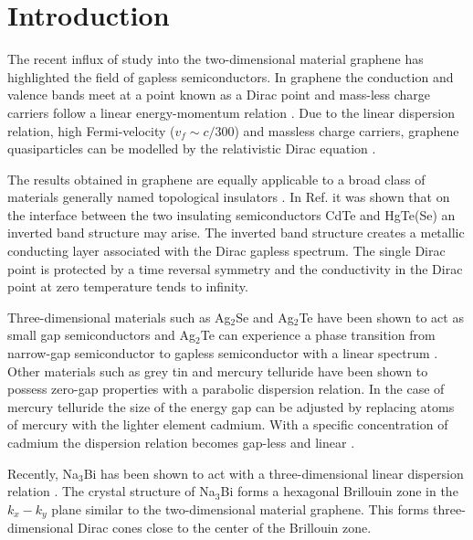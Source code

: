 \documentclass[prb,twocolumn,aps,superscriptaddress,showpacs,floatfix]{revtex4}
\begin{document}
\maketitle

\pagestyle{plain}


\section{Introduction}
	The recent influx of study into the two-dimensional material graphene has highlighted the field of gapless semiconductors. In graphene the conduction and valence bands meet at a point known as a Dirac point \cite{b1} and mass-less charge carriers follow a linear energy-momentum relation \cite{b11}. Due to the linear dispersion relation, high Fermi-velocity ($v_{f}\sim c/300$) and massless charge carriers, graphene quasiparticles can be modelled by the relativistic Dirac equation \cite{b12}.

	The results obtained in graphene are equally applicable to a broad class of materials generally named topological insulators \cite{b2,b3}.  In Ref.\cite{b2} it was shown that on the interface between the two insulating semiconductors CdTe and HgTe(Se) an inverted band structure may arise. The inverted band structure creates a metallic conducting layer associated with the Dirac gapless spectrum. The single Dirac point is protected by a time reversal symmetry and the conductivity in the Dirac point at zero temperature tends to infinity.

	Three-dimensional materials such as Ag$_{2}$Se and Ag$_{2}$Te have been shown to act as small gap semiconductors \cite{b23,b24} and Ag$_{2}$Te can experience a phase transition from narrow-gap semiconductor to gapless semiconductor with a linear spectrum \cite{b25}. Other materials such as grey tin \cite{b26} and mercury telluride \cite{b27} have been shown to possess zero-gap properties with a parabolic dispersion relation. In the case of mercury telluride the size of the energy gap can be adjusted by replacing atoms of mercury with the lighter element cadmium. With a specific concentration of cadmium the dispersion relation becomes gap-less and linear \cite{b28}.
		
	Recently, Na$_{3}$Bi has been shown to act with a three-dimensional linear dispersion relation \cite{b29}. The crystal structure of Na$_{3}$Bi forms a hexagonal Brillouin zone in the $k_{x}-k_{y}$ plane similar to the two-dimensional material graphene. This forms three-dimensional Dirac cones close to the center of the Brillouin zone.
		
\end{document}

